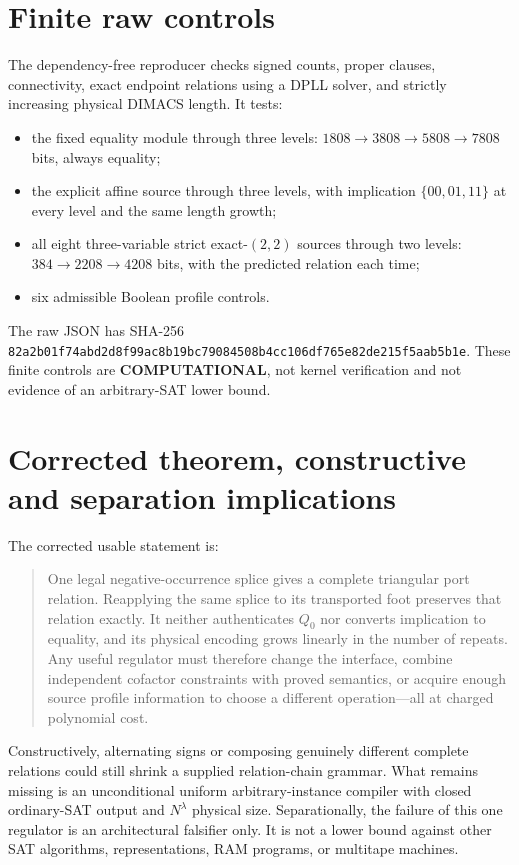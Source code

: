 \documentclass[11pt]{article}
\newcommand{\COMP}{\textbf{COMPUTATIONAL}}
\begin{document}
\section{Finite raw controls}
The dependency-free reproducer checks signed counts, proper clauses,
connectivity, exact endpoint relations using a DPLL solver, and strictly
increasing physical DIMACS length. It tests:
\begin{itemize}
\item the fixed equality module through three levels:
$1808\to3808\to5808\to7808$ bits, always equality;
\item the explicit affine source through three levels, with implication
$\{00,01,11\}$ at every level and the same length growth;
\item all eight three-variable strict exact-$(2,2)$ sources through two
levels: $384\to2208\to4208$ bits, with the predicted relation each time;
\item six admissible Boolean profile controls.
\end{itemize}
The raw JSON has SHA-256
\texttt{82a2b01f74abd2d8f99ac8b19bc79084508b4cc106df765e82de215f5aab5b1e}.
These finite controls are \COMP, not kernel verification and not evidence of
an arbitrary-SAT lower bound.

\section{Corrected theorem, constructive and separation implications}
The corrected usable statement is:
\begin{quote}
One legal negative-occurrence splice gives a complete triangular port
relation. Reapplying the same splice to its transported foot preserves that
relation exactly. It neither authenticates $Q_0$ nor converts implication to
equality, and its physical encoding grows linearly in the number of repeats.
Any useful regulator must therefore change the interface, combine independent
cofactor constraints with proved semantics, or acquire enough source profile
information to choose a different operation---all at charged polynomial cost.
\end{quote}

Constructively, alternating signs or composing genuinely different complete
relations could still shrink a supplied relation-chain grammar. What remains
missing is an unconditional uniform arbitrary-instance compiler with closed
ordinary-SAT output and $N^\lambda$ physical size. Separationally, the failure
of this one regulator is an architectural falsifier only. It is not a lower
bound against other SAT algorithms, representations, RAM programs, or
multitape machines.
\end{document}
